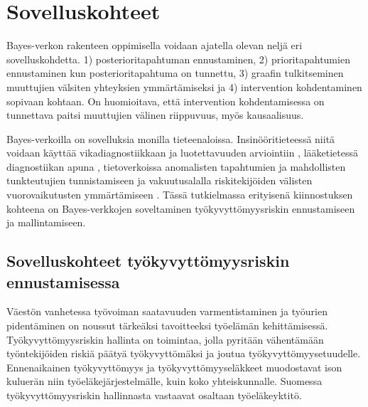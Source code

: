 \chapter{Sovelluskohteet\label{applications}}
Bayes-verkon rakenteen oppimisella voidaan ajatella olevan neljä eri sovelluskohdetta. 1) posterioritapahtuman ennustaminen, 2) prioritapahtumien ennustaminen kun posterioritapahtuma on tunnettu, 3) graafin tulkitseminen muuttujien välsiten yhteyksien ymmärtämiseksi ja 4) intervention kohdentaminen sopivaan kohtaan. On huomioitava, että intervention kohdentamisessa on tunnettava paitsi muuttujien välinen riippuvuus, myös kausaalisuus.

Bayes-verkoilla on sovelluksia monilla tieteenaloissa. Insinööritieteessä niitä voidaan käyttää vikadiagnostiikkaan ja luotettavuuden arviointiin \citep{zhang_brief_2019}, lääketietessä diagnostiikan apuna \citep{mittal_review_2011}, tietoverkoissa anomalisten tapahtumien ja mahdollisten tunkteutujien tunnistamiseen \citep{kaur_review_2013} ja vakuutusalalla riskitekijöiden välisten vuorovaikutusten ymmärtämiseen \citep{ramsahai_connecting_2020}. Tässä tutkielmassa erityisenä kiinnostuksen kohteena on Bayes-verkkojen soveltaminen työkyvyttömyysriskin ennustamiseen ja mallintamiseen.

\section{Sovelluskohteet työkyvyttömyysriskin ennustamisessa}
Väestön vanhetessa työvoiman saatavuuden varmentistaminen ja työurien pidentäminen on noussut tärkeäksi tavoitteeksi työelämän kehittämisessä. Työkyvyttömyysriskin hallinta on toimintaa, jolla pyritään vähentämään työntekijöiden riskiä päätyä työkyvyttömäksi ja joutua työkyvyttömyysetuudelle. Ennenaikainen työkyvyttömyys ja työkyvyttömyyseläkkeet muodostavat ison kuluerän niin työeläkejärjestelmälle, kuin koko yhteiskunnalle. Suomessa työkyvyttömyysriskin hallinnasta vastaavat osaltaan työeläkeyktitö.

